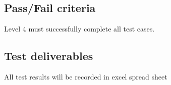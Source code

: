 \documentclass[letterpaper,12pt,oneside,listof=totoc]{scrreprt}
\begin{document}



\subsection{Pass/Fail criteria}

Level 4 must successfully complete all test cases.


\subsection{Test deliverables}

All test results will be recorded in  excel spread sheet
\end{document}
